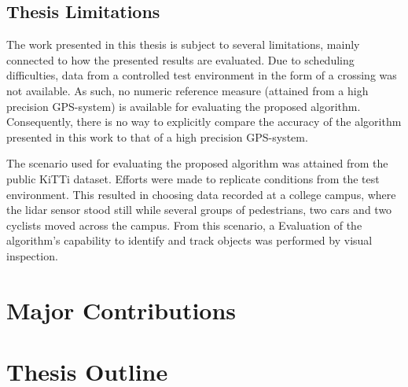 \subsection{Thesis Limitations}
The work presented in this thesis is subject to several limitations, mainly connected to how the presented results are evaluated. Due to scheduling difficulties, data from a controlled test environment in the form of a crossing was not available. As such, no numeric reference measure (attained from a high precision GPS-system) is available for evaluating the proposed algorithm. Consequently, there is no way to explicitly compare the accuracy of the algorithm presented in this work to that of a high precision GPS-system.

The scenario used for evaluating the proposed algorithm was attained from the public KiTTi dataset. Efforts were made to replicate conditions from the test environment. This resulted in choosing data recorded at a college campus, where the lidar sensor stood still while several groups of pedestrians, two cars and two cyclists moved across the campus. From this scenario, a  Evaluation of the algorithm's capability to identify and track objects was performed by visual inspection. 

\section{Major Contributions}

\section{Thesis Outline}
